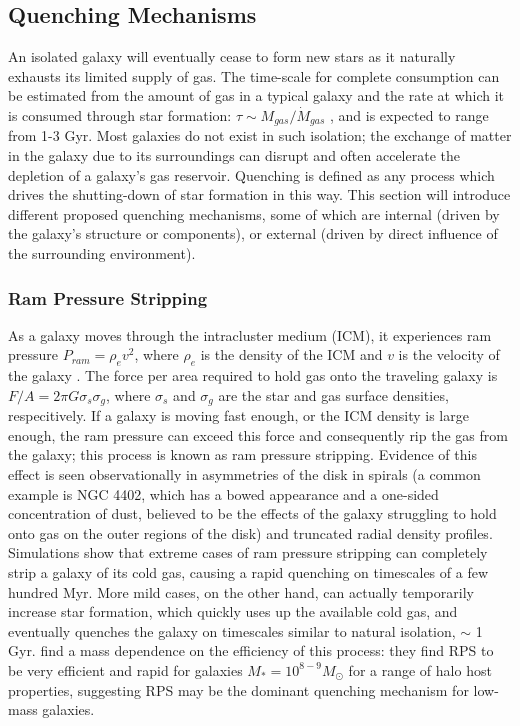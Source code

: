 \subsection{Quenching Mechanisms}
\label{ssec:qmechs}
An isolated galaxy will eventually cease to form new stars as it naturally exhausts its limited supply of gas. The time-scale for complete consumption can be estimated from the amount of gas in a typical galaxy and the rate at which it is consumed through star formation: $\tau \sim M_{gas}/\dot{M}_{gas}$ \citep{Larson1980}, and is expected to range from 1-3 Gyr. Most galaxies do not exist in such isolation; the exchange of matter in the galaxy due to its surroundings can disrupt and often accelerate the depletion of a galaxy's gas reservoir. Quenching is defined as any process which drives the shutting-down of star formation in this way. This section will introduce different proposed quenching mechanisms, some of which are internal (driven by the galaxy's structure or components), or external (driven by direct influence of the surrounding environment). 

\subsubsection{Ram Pressure Stripping}

As a galaxy moves through the intracluster medium (ICM), it experiences ram pressure $P_{ram} = \rho_e v^2$, where $\rho_e$ is the density of the ICM and $v$ is the velocity of the galaxy \citep{Gunn1972}. The force per area required to hold gas onto the traveling galaxy is $F/A = 2\pi G \sigma_{s} \sigma_{g}$, where $\sigma_{s}$ and $\sigma_{g}$ are the star and gas surface densities, respecitively. If a galaxy is moving fast enough, or the ICM density is large enough, the ram pressure can exceed this force and consequently rip the gas from the galaxy; this process is known as ram pressure stripping. Evidence of this effect is seen observationally in asymmetries of the disk in spirals (a common example is NGC 4402, which has a bowed appearance and a one-sided concentration of dust, believed to be the effects of the galaxy struggling to hold onto gas on the outer regions of the disk) and truncated radial density profiles. Simulations \citep{Steinhauser2016} show that extreme cases of ram pressure stripping can completely strip a galaxy of its cold gas, causing a rapid quenching on timescales of a few hundred Myr. More mild cases, on the other hand, can actually temporarily increase star formation, which quickly uses up the available cold gas, and eventually quenches the galaxy on timescales similar to natural isolation, $\sim$ 1 Gyr. \citet{Fillingham2016} find a mass dependence on the efficiency of this process: they find RPS to be very efficient and rapid for galaxies $M_{*} = 10^{8-9}M_{\odot}$ for a range of halo host properties, suggesting RPS may be the dominant quenching mechanism for low-mass galaxies.  

